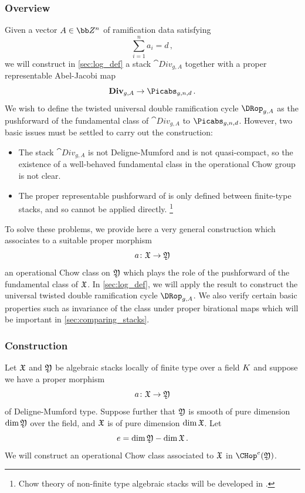 \subsubsection{Overview}
Given a vector $A \in \bb Z^n$ of ramification data satisfying
$$\sum_{i=1}^n {a_i} =d\, ,$$
we will construct in \cref{sec:log_def}
a stack $\cat{Div}_{g,A}$ together with a proper representable  Abel-Jacobi map
$$\cat{Div}_{g,A} \to \Picabs_{g,n,d}\, .$$
We wish to define the twisted universal double ramification cycle $\DRop_{g,A}$ as the pushforward of the fundamental class of $\cat{Div}_{g,A}$ to $\Picabs_{g,n,d}$.
However, two basic issues must be settled
to carry out the construction:
\begin{itemize}
\item[$\bullet$] The stack $\cat{Div}_{g,A}$ is not Deligne-Mumford and is not quasi-compact, so the existence of a well-behaved fundamental class in the operational Chow group is not clear.
\item[$\bullet$] The proper representable pushforward of \cite[Appendix B]{BaeSchmitt1} is only defined between finite-type stacks, and so cannot be applied directly. \footnote{Chow theory of non-finite type algebraic stacks will be developed in \cite[Appendix A]{BaeSchmitt1}.}
\end{itemize}


To solve these problems, we provide here a very general construction which associates to a suitable proper morphism $$a\colon \frak X \to \frak Y$$ an operational Chow class on $\frak Y$ which plays the role of the pushforward of the fundamental class of $\frak X$.
In \cref{sec:log_def}, we will apply the result to construct the universal twisted double ramification cycle $\DRop_{g,A}$. We also verify certain basic properties such as invariance of the class under proper birational maps which will be important in \cref{sec:comparing_stacks}.

\subsubsection{Construction}\label{c44c}
Let $\frak X$ and $\frak Y$ be algebraic stacks locally of finite type over a field ${K}$ and suppose we have a proper morphism $$a\colon \frak X \to \frak Y$$
of Deligne-Mumford type.
Suppose further that $\frak Y$ is smooth of pure dimension $\dim \frak Y$ over the field, and $\frak X$ is of pure dimension $\dim \frak X$. Let
$$e = \dim \frak Y-  \dim \frak X\, .$$
We  will construct an operational Chow class associated to $\frak X$ in $\CHop^e(\frak Y)$.

